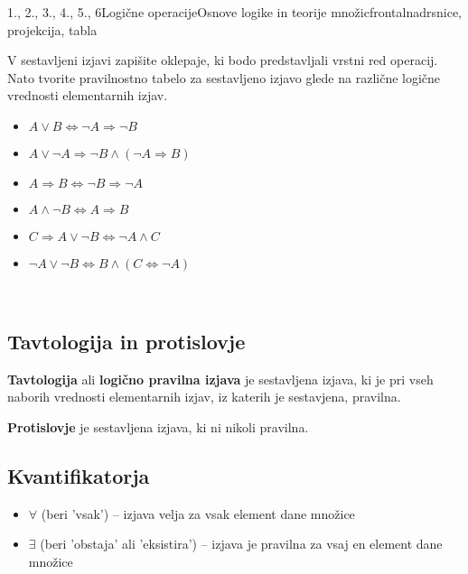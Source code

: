 \begin{priprava}{1., 2., 3., 4., 5., 6}{}{Logične operacije}{Osnove logike in teorije množic}{frontalna}{drsnice, projekcija, tabla}
   \begin{naloga}
      V sestavljeni izjavi zapišite oklepaje, ki bodo predstavljali vrstni red operacij.
      Nato tvorite pravilnostno tabelo za sestavljeno izjavo glede na različne logične 
      vrednosti elementarnih izjav.
      \begin{itemize}
          \item $A\lor B\Leftrightarrow \lnot A\Rightarrow \lnot B$
          \item $A\lor \lnot A\Rightarrow\lnot B\land (\lnot A\Rightarrow B) $
          \item $A\Rightarrow B\Leftrightarrow \lnot B\Rightarrow \lnot A $
          \item $A\land \lnot B\Leftrightarrow A \Rightarrow B$
          \item $C\Rightarrow A\lor \lnot B\Leftrightarrow \lnot A\land C $
          \item $\lnot A\lor \lnot B\Leftrightarrow B \land (C\Leftrightarrow \lnot A) $
      \end{itemize}
  \end{naloga}
~


   \subsection{Tavtologija in protislovje}

      \textbf{Tavtologija} ali \textbf{logično pravilna izjava} je sestavljena izjava, 
      ki je pri vseh naborih vrednosti elementarnih izjav, iz katerih je sestavjena, pravilna.
   
      \textbf{Protislovje} je sestavljena izjava, ki ni nikoli pravilna.
   

   \subsection{Kvantifikatorja}
      \begin{itemize}
          \item $\forall$ (beri 'vsak') -- izjava velja za vsak element dane množice
          \item $\exists$ (beri 'obstaja' ali 'eksistira') -- izjava je pravilna za vsaj en element dane množice
      \end{itemize}
   


\end{priprava}
